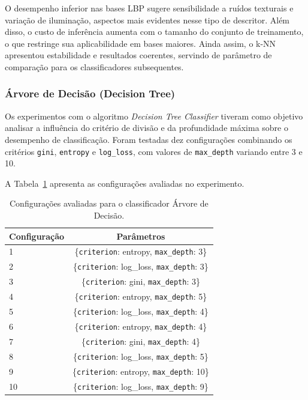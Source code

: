 \documentclass[12pt]{article}
\begin{document}
O desempenho inferior nas bases LBP sugere sensibilidade a ruídos texturais e variação de iluminação, aspectos mais evidentes nesse tipo de descritor. Além disso, o custo de inferência aumenta com o tamanho do conjunto de treinamento, o que restringe sua aplicabilidade em bases maiores. Ainda assim, o k-NN apresentou estabilidade e resultados coerentes, servindo de parâmetro de comparação para os classificadores subsequentes.





\subsubsection{Árvore de Decisão (Decision Tree)}

Os experimentos com o algoritmo \textit{Decision Tree Classifier} tiveram como objetivo analisar a influência do critério de divisão e da profundidade máxima sobre o desempenho de classificação. Foram testadas dez configurações combinando os critérios \texttt{gini}, \texttt{entropy} e \texttt{log\_loss}, com valores de \texttt{max\_depth} variando entre 3 e 10.

A Tabela~\ref{tab:dtree-config} apresenta as configurações avaliadas no experimento.

\begin{table}[H]
\centering
\caption{Configurações avaliadas para o classificador Árvore de Decisão.}
\label{tab:dtree-config}
\begin{tabular}{lc}
\toprule
\textbf{Configuração} & \textbf{Parâmetros} \\
\midrule
1 & \{\texttt{criterion}: entropy, \texttt{max\_depth}: 3\} \\
2 & \{\texttt{criterion}: log\_loss, \texttt{max\_depth}: 3\} \\
3 & \{\texttt{criterion}: gini, \texttt{max\_depth}: 3\} \\
4 & \{\texttt{criterion}: entropy, \texttt{max\_depth}: 5\} \\
5 & \{\texttt{criterion}: log\_loss, \texttt{max\_depth}: 4\} \\
6 & \{\texttt{criterion}: entropy, \texttt{max\_depth}: 4\} \\
7 & \{\texttt{criterion}: gini, \texttt{max\_depth}: 4\} \\
8 & \{\texttt{criterion}: log\_loss, \texttt{max\_depth}: 5\} \\
9 & \{\texttt{criterion}: entropy, \texttt{max\_depth}: 10\} \\
10 & \{\texttt{criterion}: log\_loss, \texttt{max\_depth}: 9\} \\
\bottomrule
\end{tabular}
\end{table}
\end{document}
